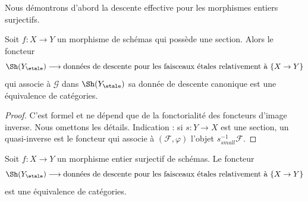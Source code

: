 \medskip\noindent
Nous démontrons d'abord la descente effective pour les morphismes entiers surjectifs.

\begin{lemma}
\label{lemma-glue-etale-sheaf-section}
Soit $f : X \to Y$ un morphisme de schémas qui possède une section. Alors le
foncteur
$$
\Sh(Y_\etale)
\longrightarrow
\text{données de descente pour les faisceaux étales relativement à }\{X \to Y\}
$$
qui associe à $\mathcal{G}$ dans $\Sh(Y_\etale)$ sa donnée de descente canonique
est une équivalence de catégories.
\end{lemma}

\begin{proof}
C'est formel et ne dépend que de la fonctorialité des foncteurs
d'image inverse. Nous omettons les détails. Indication : si $s : Y \to X$ est une section,
un quasi-inverse est le foncteur qui associe à $(\mathcal{F}, \varphi)$
l'objet $s_{small}^{-1}\mathcal{F}$.
\end{proof}

\begin{lemma}
\label{lemma-glue-etale-sheaf-integral-surjective}
Soit $f : X \to Y$ un morphisme entier surjectif de schémas.
Le foncteur
$$
\Sh(Y_\etale)
\longrightarrow
\text{données de descente pour les faisceaux étales relativement à }\{X \to Y\}
$$
est une équivalence de catégories.
\end{lemma}

